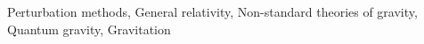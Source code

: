 \documentclass[twocolumn]{aastex631}
\begin{document}
Perturbation methods, General relativity, Non-standard theories of gravity, Quantum gravity, Gravitation
\end{document}
